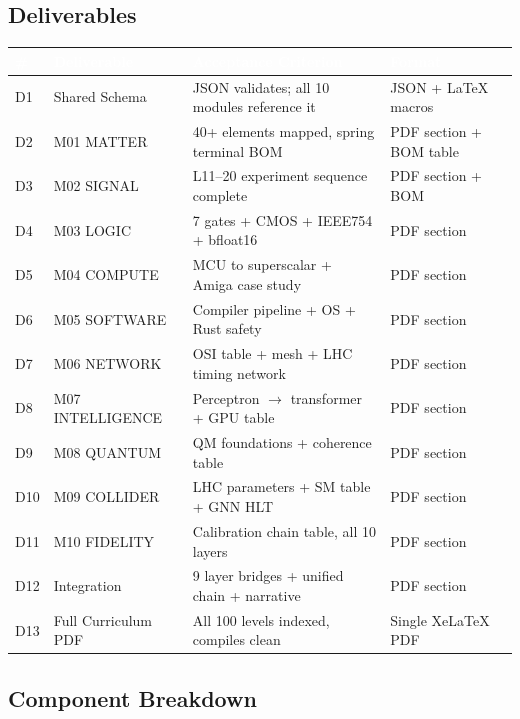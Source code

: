 \documentclass[11pt,letterpaper]{article}
\newcommand{\tableheader}[1]{\textbf{\sffamily\textcolor{white}{#1}}}
\begin{document}
\subsection{Deliverables}

\begin{center}
\begin{tabularx}{\textwidth}{C{0.8cm}L{3.5cm}L{3.5cm}X}
\toprule
{}
\tableheader{\#} & \tableheader{Deliverable} & \tableheader{Acceptance Criterion} & \tableheader{Format} \\
\midrule
D1 & Shared Schema & JSON validates; all 10 modules reference it & JSON + LaTeX macros \\
D2 & M01 MATTER & 40+ elements mapped, spring terminal BOM & PDF section + BOM table \\
D3 & M02 SIGNAL & L11--20 experiment sequence complete & PDF section + BOM \\
D4 & M03 LOGIC & 7 gates + CMOS + IEEE754 + bfloat16 & PDF section \\
D5 & M04 COMPUTE & MCU to superscalar + Amiga case study & PDF section \\
D6 & M05 SOFTWARE & Compiler pipeline + OS + Rust safety & PDF section \\
D7 & M06 NETWORK & OSI table + mesh + LHC timing network & PDF section \\
D8 & M07 INTELLIGENCE & Perceptron $\rightarrow$ transformer + GPU table & PDF section \\
D9 & M08 QUANTUM & QM foundations + coherence table & PDF section \\
D10 & M09 COLLIDER & LHC parameters + SM table + GNN HLT & PDF section \\
D11 & M10 FIDELITY & Calibration chain table, all 10 layers & PDF section \\
D12 & Integration & 9 layer bridges + unified chain + narrative & PDF section \\
D13 & Full Curriculum PDF & All 100 levels indexed, compiles clean & Single XeLaTeX PDF \\
\bottomrule
\end{tabularx}
\end{center}

\subsection{Component Breakdown}
\end{document}
